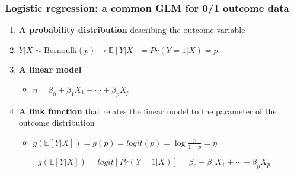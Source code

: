 \documentclass[table]{beamer}\usepackage[]{graphicx}\usepackage[]{color}
\begin{document}

\begin{frame}
\frametitle{Logistic regression: a common GLM for 0/1 outcome data}

\begin{enumerate}
\item {\bf A probability distribution} describing the outcome variable \\
\bi
\item $Y|X \sim \text{Bernoulli}(p) \longrightarrow \mathbb E[Y|X] = Pr(Y=1|X) = p$. 
\ei
\item {\bf A linear model}
\begin{itemize}
\item $\eta = \beta_0+\beta_1 X_1 + \cdots + \beta_p X_p$
\end{itemize}
\item {\bf A link function} that relates the linear model to the parameter of the outcome distribution
\begin{itemize}
\item $g(\mathbb E[Y|X]) = g(p) = logit(p) = \log\frac{p}{1-p} = \eta$ 
\end{itemize}
\end{enumerate}

$$g(\mathbb E[Y|X]) = logit[Pr(Y=1|X)] = \beta_0+\beta_1 X_1 + \cdots + \beta_p X_p$$

\end{frame}
\end{document}
